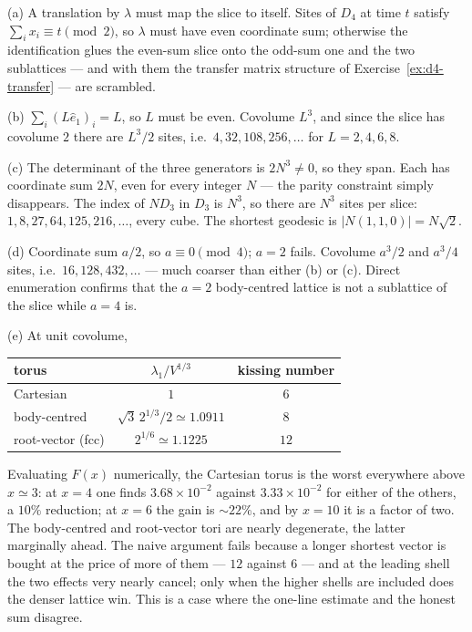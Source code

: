 {(a) A translation by $\lambda$ must map the slice to itself. Sites of $D_4$ at
time $t$ satisfy $\sum_i x_i\equiv t \pmod 2$, so $\lambda$ must have even
coordinate sum; otherwise the identification glues the even-sum slice onto the
odd-sum one and the two sublattices --- and with them the transfer matrix
structure of Exercise~\ref{ex:d4-transfer} --- are scrambled.

(b) $\sum_i(L\hat{e}_1)_i=L$, so $L$ must be even. Covolume $L^3$, and since
the slice has covolume $2$ there are $L^3/2$ sites, i.e.\ $4,32,108,256,\dots$
for $L=2,4,6,8$.

(c) The determinant of the three generators is $2N^3\neq0$, so they span.
Each has coordinate sum $2N$, even for every integer $N$ --- the parity
constraint simply disappears. The index of $N D_3$ in $D_3$ is $N^3$, so there
are $N^3$ sites per slice: $1,8,27,64,125,216,\dots$, every cube. The shortest
geodesic is $|N(1,1,0)|=N\sqrt2$.

(d) Coordinate sum $a/2$, so $a\equiv0\pmod4$; $a=2$ fails. Covolume $a^3/2$
and $a^3/4$ sites, i.e.\ $16,128,432,\dots$ --- much coarser than either (b) or
(c). Direct enumeration confirms that the $a=2$ body-centred lattice is not a
sublattice of the slice while $a=4$ is.

(e) At unit covolume,
\begin{center}
\begin{tabular}{lcc}
 torus & $\lambda_1/V^{1/3}$ & kissing number\\ \hline
 Cartesian & $1$ & $6$\\
 body-centred & $\sqrt3\,2^{1/3}/2\simeq1.0911$ & $8$\\
 root-vector (fcc) & $2^{1/6}\simeq1.1225$ & $12$
\end{tabular}
\end{center}
Evaluating $F(x)$ numerically, the Cartesian torus is the worst everywhere
above $x\simeq3$: at $x=4$ one finds $3.68\times10^{-2}$ against
$3.33\times10^{-2}$ for either of the others, a $10\%$ reduction; at $x=6$ the
gain is $\sim22\%$, and by $x=10$ it is a factor of two. The body-centred and
root-vector tori are nearly degenerate, the latter marginally ahead. The naive
argument fails because a longer shortest vector is bought at the price of more
of them --- $12$ against $6$ --- and at the leading shell the two effects very
nearly cancel; only when the higher shells are included does the denser lattice
win. This is a case where the one-line estimate and the honest sum disagree.

}
